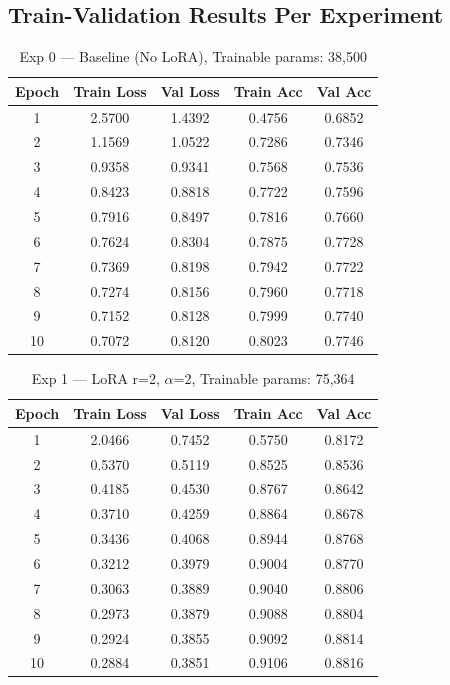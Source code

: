 \documentclass[12pt,a4paper]{article}
\begin{document}
\subsection{Train-Validation Results Per Experiment}

\begin{table}[H]
\centering
\caption{Exp 0 — Baseline (No LoRA), Trainable params: 38,500}
\small
\begin{tabular}{ccccc}
\toprule
Epoch & Train Loss & Val Loss & Train Acc & Val Acc \\ \midrule
1  & 2.5700 & 1.4392 & 0.4756 & 0.6852 \\
2  & 1.1569 & 1.0522 & 0.7286 & 0.7346 \\
3  & 0.9358 & 0.9341 & 0.7568 & 0.7536 \\
4  & 0.8423 & 0.8818 & 0.7722 & 0.7596 \\
5  & 0.7916 & 0.8497 & 0.7816 & 0.7660 \\
6  & 0.7624 & 0.8304 & 0.7875 & 0.7728 \\
7  & 0.7369 & 0.8198 & 0.7942 & 0.7722 \\
8  & 0.7274 & 0.8156 & 0.7960 & 0.7718 \\
9  & 0.7152 & 0.8128 & 0.7999 & 0.7740 \\
10 & 0.7072 & 0.8120 & 0.8023 & 0.7746 \\
\bottomrule
\end{tabular}
\end{table}

\begin{table}[H]
\centering
\caption{Exp 1 — LoRA r=2, $\alpha$=2, Trainable params: 75,364}
\small
\begin{tabular}{ccccc}
\toprule
Epoch & Train Loss & Val Loss & Train Acc & Val Acc \\ \midrule
1  & 2.0466 & 0.7452 & 0.5750 & 0.8172 \\
2  & 0.5370 & 0.5119 & 0.8525 & 0.8536 \\
3  & 0.4185 & 0.4530 & 0.8767 & 0.8642 \\
4  & 0.3710 & 0.4259 & 0.8864 & 0.8678 \\
5  & 0.3436 & 0.4068 & 0.8944 & 0.8768 \\
6  & 0.3212 & 0.3979 & 0.9004 & 0.8770 \\
7  & 0.3063 & 0.3889 & 0.9040 & 0.8806 \\
8  & 0.2973 & 0.3879 & 0.9088 & 0.8804 \\
9  & 0.2924 & 0.3855 & 0.9092 & 0.8814 \\
10 & 0.2884 & 0.3851 & 0.9106 & 0.8816 \\
\bottomrule
\end{tabular}
\end{table}
\end{document}
